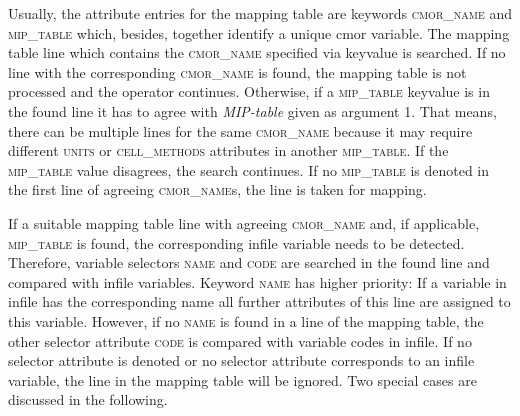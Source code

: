 Usually, the attribute entries for the mapping table are keywords \textsc{cmor\_name} and \textsc{mip\_table} which, besides, together identify a unique cmor variable. The mapping table line which contains the \textsc{cmor\_name} specified via keyvalue is searched. If no line with the corresponding \textsc{cmor\_name} is found, the mapping table is not processed and the operator continues. Otherwise, if a \textsc{mip\_table} keyvalue is in the found line it has to agree with \textit{MIP-table} given as argument 1. That means, there can be multiple lines for the same \textsc{cmor\_name} because it may require different \textsc{units} or \textsc{cell\_methods} attributes in another \textsc{mip\_table}. If the \textsc{mip\_table} value disagrees, the search continues. If no \textsc{mip\_table} is denoted in the first line of agreeing \textsc{cmor\_name}s, the line is taken for mapping.

If a suitable mapping table line with agreeing \textsc{cmor\_name} and, if applicable, \textsc{mip\_table} is found, the corresponding infile variable needs to be detected. Therefore, variable selectors \textsc{name} and \textsc{code} are searched in the found line and compared with infile variables. Keyword \textsc{name} has higher priority: If a variable in infile has the corresponding name all further attributes of this line are assigned to this variable. However, if no \textsc{name} is found in a line of the mapping table, the other selector attribute \textsc{code} is compared with variable codes in infile. If no selector attribute is denoted or no selector attribute corresponds to an infile variable, the line in the mapping table will be ignored. Two special cases are discussed in the following.


